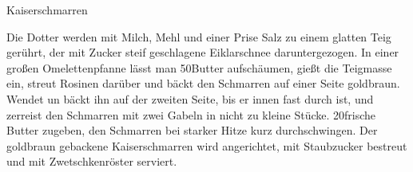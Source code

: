 \begin{recipe}[\vegetarian]{Kaiserschmarren}
%
%
%
%
%

\begin{ingredients}
\end{ingredients}

\begin{instructions}
    Die Dotter werden mit Milch, Mehl und einer Prise Salz zu einem glatten Teig gerührt, der mit Zucker steif geschlagene Eiklarschnee daruntergezogen.
    In einer großen Omelettenpfanne lässt man 50\gram Butter aufschäumen, gießt die Teigmasse ein, streut Rosinen darüber und bäckt den Schmarren auf einer Seite goldbraun.
    Wendet un bäckt ihn auf der zweiten Seite, bis er innen fast durch ist, und zerreist den Schmarren mit zwei Gabeln in nicht zu kleine Stücke.
    20\gram frische Butter zugeben, den Schmarren bei starker Hitze kurz durchschwingen.
    Der goldbraun gebackene Kaiserschmarren wird angerichtet, mit Staubzucker bestreut und mit Zwetschkenröster serviert.
\end{instructions}
\end{recipe}
